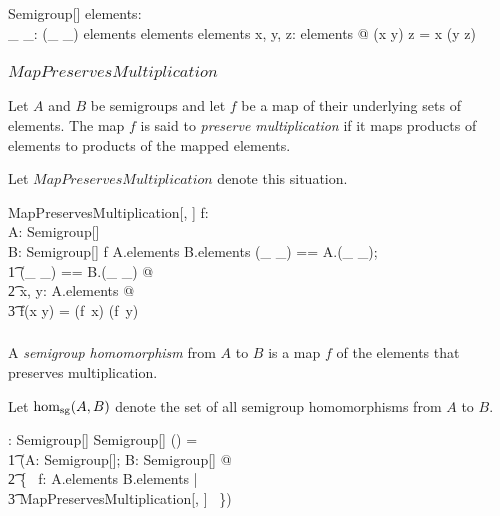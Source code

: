 \documentclass[12pt]{article}
\begin{document}
\begin{schema}{Semigroup}[\genT]
elements: \power \genT \\
\_ \mulG \_: \genT \cross \genT \pfun \genT
\where
(\_ \mulG \_) \in elements \cross elements \fun elements
\also
\forall x, y, z: elements @ (x \mulG y) \mulG z = x \mulG (y \mulG z)
\end{schema}

\subsubsection{$MapPreservesMultiplication$}

Let $A$ and $B$ be semigroups and let $f$ be a map of their underlying sets of elements.
The map $f$ is said to {\em preserve multiplication} 
if it maps products of elements to products of the mapped elements.

Let $MapPreservesMultiplication$ denote this situation.

\begin{schema}{MapPreservesMultiplication}[\genT, \genU]
f: \genT \pfun \genU \\
A: Semigroup[\genT] \\
B: Semigroup[\genU]
\where
f \in A.elements \fun B.elements
\also
\LET (\_ \mulG \_) == A.(\_ \mulG \_); \\
\t1	(\_ \timesG \_) == B.(\_ \mulG \_) @ \\
\t2		\forall x, y: A.elements @ \\
\t3			f(x \mulG y) = (f~x) \timesG (f~y)
\end{schema}

\subsubsection{}

A {\em semigroup homomorphism} from $A$ to $B$ is a map $f$ of the elements that preserves
multiplication.

Let $\operatorname{hom_{sg}}(A, B)$ denote the set of all semigroup homomorphisms from $A$ to $B$.

\begin{gendef}[\genT, \genU]
\HomSemigroup: Semigroup[\genT] \cross Semigroup[\genU] \fun \power (\genT \pfun \genU)
\where
\HomSemigroup = \\
\t1	(\lambda A: Semigroup[\genT]; B: Semigroup[\genU] @ \\
\t2		\{~ f: A.elements \fun B.elements | \\
\t3			MapPreservesMultiplication[\genT, \genU] ~\})
\end{gendef}
\end{document}
